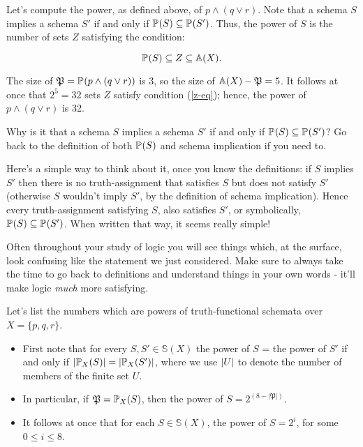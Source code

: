 \begin{example}
    Let's compute the power, as defined above, of $p\wedge (q\vee r)$. Note that a schema $S$ implies a schema $S'$ if and only if $\prop{S}{}\subseteq\prop{S'}{}$. Thus, the power of $S$ is the number of sets $Z$ satisfying the condition: 

    \begin{equation}\label{z-eq}
        \prop{S}{}\subseteq Z\subseteq \mathbb{A}(X). 
    \end{equation}

    The size of $\mfp=\prop{p\wedge (q\vee r)}{}$ is 3, so the size of $\mathbb{A}(X)-\mfp=5$. It follows at once that $2^5 =32$ sets $Z$ satisfy condition (\ref{z-eq}); hence, the power of $p\wedge (q\vee r)$ is 32.
\end{example}

\begin{aside}
    Why is it that a schema $S$ implies a schema $S'$ if and only if $\prop{S}{}\subseteq\prop{S'}{}$? Go back to the definition of both $\prop{S}{}$ and schema implication if you need to. 

    Here's a simple way to think about it, once you know the definitions: if $S$ implies $S'$ then there is no truth-assignment that satisfies $S$ but does not satisfy $S'$ (otherwise $S$ wouldn't imply $S'$, by the definition of schema implication). Hence every truth-assignment satisfying $S$, also satisfies $S'$, or symbolically, $\prop{S}{}\subseteq\prop{S'}{}$. When written that way, it seems really simple!

    Often throughout your study of logic you will see things which, at the surface, look confusing like the statement we just considered. Make sure to always take the time to go back to definitions and understand things in your own words - it'll make logic \emph{much} more satisfying. 
\end{aside}

\begin{example}
    Let's list the numbers which are powers of truth-functional schemata over $X=\{p,q,r\}$.

    \begin{itemize}
        \item First note that for every $S,S'\in\mathbb{S}(X)$ the power of $S$ = the power of $S'$ if and only if $\size{\prop{S}{X}}=\size{\prop{S'}{X}}$, where we use $\size{U}$ to denote the number of members of the finite set $U$. 

        \item In particular, if $\mfp=\prop{S}{X}$, then the power of $S = 2^{(8-|\mathfrak{P}|)}$.

        \item It follows at once that for each $S\in\mathbb{S}(X)$, the power of $S = 2^i$, for some $0\leq i\leq 8$.
    \end{itemize}  
\end{example}

